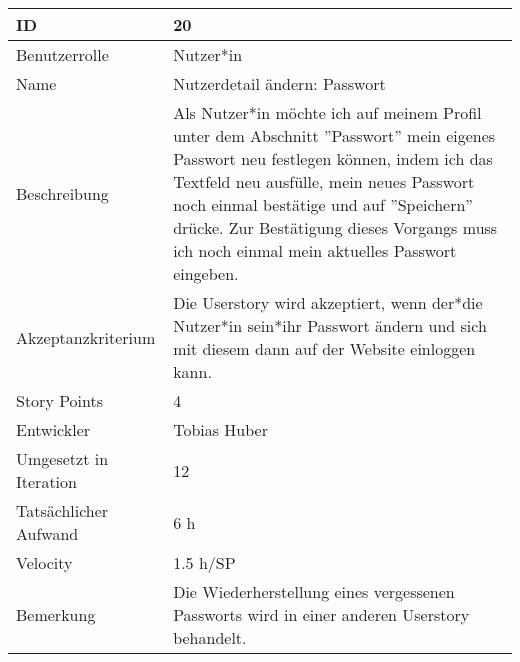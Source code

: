 \begin{tabularx}{\textwidth}{|p{}|X|}
	\hline
	ID & 20\\
	\hline
	Benutzerrolle & Nutzer*in\\
	\hline
	Name & Nutzerdetail ändern: Passwort\\
	\hline
	Beschreibung & Als Nutzer*in möchte ich auf meinem Profil unter dem Abschnitt ''Passwort'' mein eigenes Passwort neu festlegen können, indem ich das Textfeld neu ausfülle, mein neues Passwort noch einmal bestätige und auf ''Speichern'' drücke. Zur Bestätigung dieses Vorgangs muss ich noch einmal mein aktuelles Passwort eingeben.\\
	\hline
	Akzeptanzkriterium & Die Userstory wird akzeptiert, wenn der*die Nutzer*in sein*ihr Passwort ändern und sich mit diesem dann auf der Website einloggen kann.\\
	\hline
	Story Points & 4\\
	\hline
	Entwickler & Tobias Huber\\
	\hline
	Umgesetzt in Iteration & 12\\
	\hline
	Tatsächlicher Aufwand & 6 h\\
	\hline
	Velocity & 1.5 h/SP\\
	\hline
	Bemerkung & Die Wiederherstellung eines vergessenen Passworts wird in einer anderen Userstory behandelt.\\
	\hline
\end{tabularx}
\vspace{20pt}
